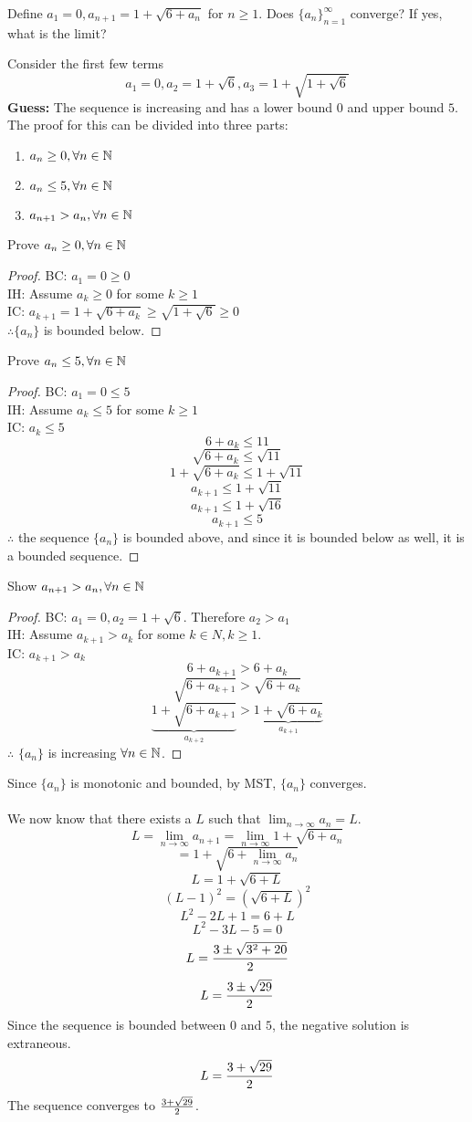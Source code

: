 \documentclass[english, 12pt]{article}
\begin{document}
\begin{exmp}
Define $a_{1}=0,a_{n+1}=1+\sqrt{6+a_{n}}$ for $n \geq 1$. Does $\{a_{n}\}_{n=1}^\infty$ converge? If yes, what is the limit?
\begin{sol}
Consider the first few terms
\[a_{1}=0, a_{2} = 1+\sqrt{6}, a_{3} = 1+\sqrt{1+\sqrt{6}} \]
\textbf{Guess: }The sequence is increasing and has a lower bound $0$ and upper bound $5$. The proof for this can be divided into three parts:
\begin{enumerate}
\item $a_{n} \geq 0, \forall n \in {\mathbb{N}}$
\item $a_{n} \leq 5, \forall n \in {\mathbb{N}}$
\item $a_{n+1} > a_{n}, \forall n \in {\mathbb{N}}$
\end{enumerate}
Prove $a_{n} \geq 0, \forall n \in {\mathbb{N}}$
\begin{proof}
BC: $a_{1} = 0 \geq 0$\\
IH: Assume $a_{k} \geq 0$ for some $k \geq 1$\\
IC: $a_{k+1}=1+\sqrt{6+a_{k}} \geq \sqrt{1 + \sqrt 6} \geq 0 $\\
$\therefore \{a_{n}\}$ is bounded below. 
\end{proof}
Prove $a_{n} \leq 5, \forall n \in {\mathbb{N}}$
\begin{proof}
BC: $a_{1} = 0 \leq 5$\\
IH: Assume $a_{k} \leq 5$ for some $k \geq 1$\\
IC: $a_{k} \leq 5$
\[6+a_{k} \leq 11 \]
\[\sqrt{6+a_{k}} \leq \sqrt{11} \]
\[1+\sqrt{6+a_{k}} \leq 1+ \sqrt{11} \]
\[a_{k+1} \leq 1+ \sqrt{11} \]
\[a_{k+1} \leq 1+ \sqrt{16} \]
\[a_{k+1} \leq 5\]
$\therefore$ the sequence $\{a_{n}\}$ is bounded above, and since it is bounded below as well, it is a bounded sequence.
\end{proof}
Show $a_{n+1} > a_{n}, \forall n \in {\mathbb{N}}$
\begin{proof}
BC: $a_{1}=0, a_{2} = 1+\sqrt{6}$. Therefore $a_{2} > a_{1}$\\
IH: Assume $a_{k+1} > a_{k}$ for some $k \in N, k \geq 1$.\\
IC: $a_{k+1} > a_{k}$
\[6+a_{k+1} > 6 + a_{k} \]
\[\sqrt{6+a_{k+1}} > \sqrt{6 + a_{k}} \]
\[\underbrace{1+\sqrt{6+a_{k+1}}}_{a_{k+2}} > \underbrace{1+\sqrt{6 + a_{k}}}_{a_{k+1}} \]
$\therefore$ $\{a_{n}\}$ is increasing $\forall n \in {\mathbb{N}}$.
\end{proof}
Since $\{a_{n}\}$ is monotonic and bounded, by MST,  $\{a_{n}\}$ converges.\\\\
We now know that there exists a $L$ such that $\lim_{n\to\infty} a_{n} = L$.
\[L=\lim_{n\to\infty} a_{n+1} = \lim_{n\to\infty} 1 + \sqrt{6+a_{n}} \]
\[=1+\sqrt{6+\lim_{n\to\infty} a_{n}} \]
\[ L = 1 + \sqrt{6 + L} \]
\[(L-1)^2 = (\sqrt{6 + L})^2 \]
\[L^2-2L+1 = 6 + L \]
\[L^2-3L-5 = 0 \]
\[L = \frac{3\pm \sqrt{3^2+20}}{2} \]
\[L = \frac{3\pm \sqrt{29}}{2} \]
Since the sequence is bounded between $0$ and $5$, the negative solution is extraneous.
\[L = \frac{3+\sqrt{29}}{2} \]
The sequence converges to $\frac{3+\sqrt{29}}{2}$.
\end{sol}
\end{exmp}
\end{document}
